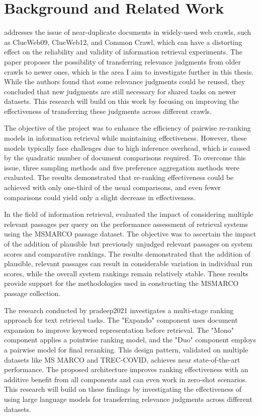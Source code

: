 \chapter{Background and Related Work}\label{related-work}

\cite{froebe:2021} addresses the issue of near-duplicate documents in widely-used web crawls, such as ClueWeb09, ClueWeb12, and Common Crawl, which can have a distorting effect on the reliability and validity of information retrieval experiments. The paper proposes the possibility of transferring relevance judgments from older crawls to newer ones, which is the area I aim to investigate further in this thesis. While the authors found that some relevance judgments could be reused, they concluded that new judgments are still necessary for shared tasks on newer datasets. This research will build on this work by focusing on improving the effectiveness of transferring these judgments across different crawls.

The objective of the \citet{gienapp:2022} project was to enhance the efficiency of pairwise re-ranking models in information retrieval while maintaining effectiveness. However, these models typically face challenges due to high inference overhead, which is caused by the quadratic number of document comparisons required. To overcome this issue, three sampling methods and five preference aggregation methods were evaluated. The results demonstrated that re-ranking effectiveness could be achieved with only one-third of the usual comparisons, and even fewer comparisons could yield only a slight decrease in effectiveness.

In the field of information retrieval, \citet{mackenzie:2021} evaluated the impact of considering multiple relevant passages per query on the performance assessment of retrieval systems using the MSMARCO passage dataset. The objective was to ascertain the impact of the addition of plausible but previously unjudged relevant passages on system scores and comparative rankings. The results demonstrated that the addition of plausible, relevant passages can result in considerable variation in individual run scores, while the overall system rankings remain relatively stable. These results provide support for the methodologies used in constructing the MSMARCO passage collection.

The research conducted by pradeep2021 investigates a multi-stage ranking approach for text retrieval tasks. The "Expando" component uses document expansion to improve keyword representation before retrieval. The "Mono" component applies a pointwise ranking model, and the "Duo" component employs a pairwise model for final reranking. This design pattern, validated on multiple datasets like MS MARCO and TREC-COVID, achieves near state-of-the-art performance. The proposed architecture improves ranking effectiveness with an additive benefit from all components and can even work in zero-shot scenarios. This research will build on these findings by investigating the effectiveness of using large language models for transferring relevance judgments across different datasets.

